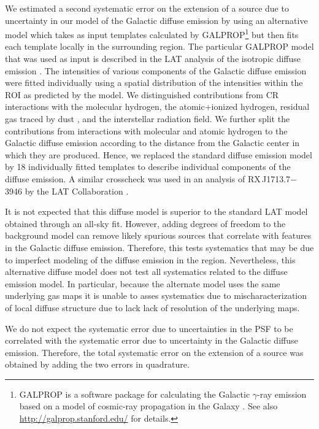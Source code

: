 \documentclass[12pt,preprint]{aastex}
\begin{document}
We estimated a second systematic error on the extension of a source
due to uncertainty in our model of the Galactic diffuse emission by
using an alternative model which takes as input templates
calculated by
GALPROP\footnote{GALPROP is a software package for calculating the
Galactic $\gamma$-ray emission based on a model of cosmic-ray propagation
in the Galaxy \citep{galprop1998,galprop2011}. 
See also \url{http://galprop.stanford.edu/} for details.} 
but then fits each template locally in
the surrounding region.
The particular GALPROP model that was used as input is described in
the LAT analysis of the isotropic diffuse
emission \citep{isotropic_lat}.  
The intensities of various components
of the Galactic diffuse emission were fitted individually using a
spatial distribution of the intensities within the ROI as predicted by
the model.  We distinguished contributions from CR interactions with the
molecular hydrogen, the atomic+ionized hydrogen, residual gas traced
by dust \citep{isabelle_dark_gass}, and the interstellar radiation
field. We further split the contributions from interactions with molecular
and atomic hydrogen to the Galactic diffuse emission according to the
distance from the Galactic center in which they are produced. Hence, we
replaced the standard diffuse emission model by 18 individually fitted
templates to describe individual components of the diffuse emission.
A similar crosscheck was used in an analysis of RX\,J1713.7$-$3946 
by the LAT Collaboration \citep{rx_j1713_lat}.

It is not expected that this diffuse model is superior to the standard
LAT model obtained through an all-sky fit.  However, adding degrees of
freedom to the background model can remove likely spurious sources that
correlate with features in the Galactic diffuse emission.  Therefore,
this tests systematics that may be due to imperfect modeling of the
diffuse emission in the region. Nevertheless, this alternative diffuse
model does not test all systematics related to the diffuse emission model.
In particular, because the alternate model uses the same underlying gas
maps it is unable to asses systematics due to mischaracterization of local
diffuse structure due to lack lack of resolution of the underlying maps.

We do not expect the systematic error
due to uncertainties in the PSF to be correlated with the systematic
error due to uncertainty in the Galactic diffuse emission. Therefore,
the total systematic error on the extension of a source was obtained by
adding the two errors in quadrature.
\end{document}

